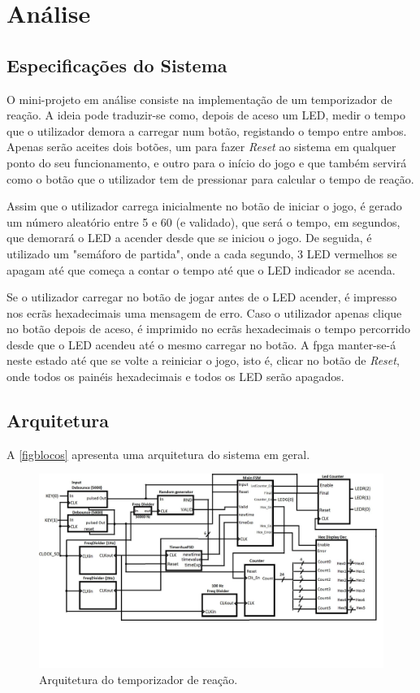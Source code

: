 \documentclass[a4paper,11pt,onecolumn]{report}
\begin{document}
\chapter{Análise}
\label{chap.analise}

\section{Especificações do Sistema}
O mini-projeto em análise consiste na implementação de um temporizador de reação. A ideia pode traduzir-se como, depois de aceso um LED, medir o tempo que o utilizador demora a carregar num botão, registando o tempo entre ambos. Apenas serão aceites dois botões, um para fazer \textit{Reset} ao sistema em qualquer ponto do seu funcionamento, e outro para o início do jogo e que também servirá como o botão que o utilizador tem de pressionar para calcular o tempo de reação.

Assim que o utilizador carrega inicialmente no botão de iniciar o jogo, é gerado um número aleatório entre 5 e 60 (e validado), que será o tempo, em segundos, que demorará o LED a acender desde que se iniciou o jogo. De seguida, é utilizado um "semáforo de partida", onde a cada segundo, 3 LED vermelhos se apagam até que começa a contar o tempo até que o LED indicador se acenda.

Se o utilizador carregar no botão de jogar antes de o LED acender, é impresso nos ecrãs hexadecimais uma mensagem de erro. Caso o utilizador apenas clique no botão depois de aceso, é imprimido no ecrãs hexadecimais o tempo percorrido desde que o LED acendeu até o mesmo carregar no botão. A \ac{fpga} manter-se-á neste estado até que se volte a reiniciar o jogo, isto é, clicar no botão de \textit{Reset}, onde todos os painéis hexadecimais e todos os LED serão apagados.

\pagebreak

\section{Arquitetura}
A \autoref{figblocos} apresenta uma arquitetura do sistema em geral.

\begin{figure}[h]
\centerline{\includegraphics[scale=0.25]{Images/BlockDiagram}}
\caption{Arquitetura do temporizador de reação.}
\label{figblocos}
\end{figure}
\end{document}
